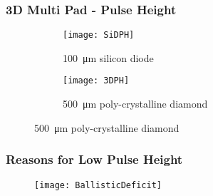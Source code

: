 \begin{frame}
	\frametitle{3D Multi Pad - Pulse Height}
	\begin{figure}
		\centering
		\begin{subfigure}[t]{0.45\textwidth}
			\centering
			\texttt{[image: SiDPH]}
			\caption{\SI{100}{\micro\meter} silicon diode}
		\end{subfigure}
		\begin{subfigure}[t]{0.45\textwidth}
			\centering
			\texttt{[image: 3DPH]}
			\caption{\SI{500}{\micro\meter} poly-crystalline diamond}
		\end{subfigure}
	\end{figure}
\end{frame}
\begin{frame}
	\frametitle{Reasons for Low Pulse Height}
	\begin{figure}
		\centering
		\texttt{[image: BallisticDeficit]}
	\end{figure}
\end{frame}
